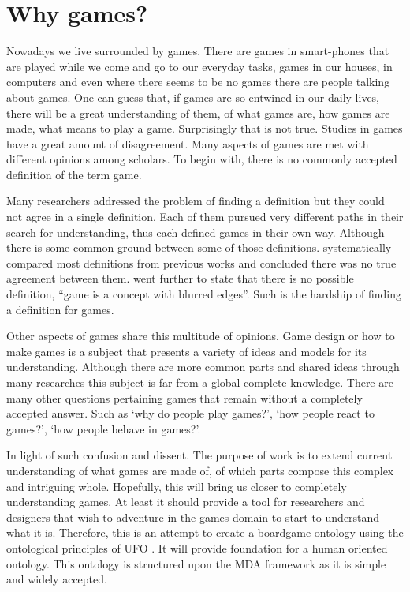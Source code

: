 \section{Why games?}

Nowadays we live surrounded by games. There are games in smart-phones that are played while we come and go to our everyday tasks, games in our houses, in computers and even where there seems to be no games there are people talking about games. One can guess that, if games are so entwined in our daily lives, there will be a great understanding of them, of what games are, how games are made, what means to play a game. Surprisingly that is not true. Studies in games have a great amount of disagreement. Many aspects of games are met with different opinions among scholars. To begin with, there is no commonly accepted definition of the term game. 

Many researchers addressed the problem of finding a definition \citep{jarvinen2009games,salen2004rules,crawford1984art,schell2014art,juul2010game} but they could not agree in a single definition. Each of them pursued very different paths in their search for understanding, thus each defined games in their own way. Although there is some common ground between some of those definitions. \cite{salen2004rules} systematically compared most definitions from previous works and concluded there was no true agreement between them. \cite{wittgenstein_philosophical_2009} went further to state that there is no possible definition, ``game is a concept with blurred edges''. Such is the hardship of finding a definition for games.

Other aspects of games share this multitude of opinions. Game design or how to make games is a subject that presents a variety of ideas and models for its understanding. Although there are more common parts and shared ideas through many researches this subject is far from a global complete knowledge. There are many other questions pertaining games that remain without a completely accepted answer. Such as `why do people play games?', `how people react to games?', `how people behave in games?'.

In light of such confusion and dissent. The purpose of work is to extend current understanding of what games are made of, of which parts compose this complex and intriguing whole. Hopefully, this will bring us closer to completely understanding games. At least it should provide a tool for researchers and designers that wish to adventure in the games domain to start to understand what it is. Therefore, this is an attempt to create a boardgame ontology using the ontological principles of UFO \citep{guizzardi_ontological_2005}. It will provide foundation for a human oriented ontology. This ontology is structured upon the MDA framework \citep{Hunicke2004} as it is simple and widely accepted. 
